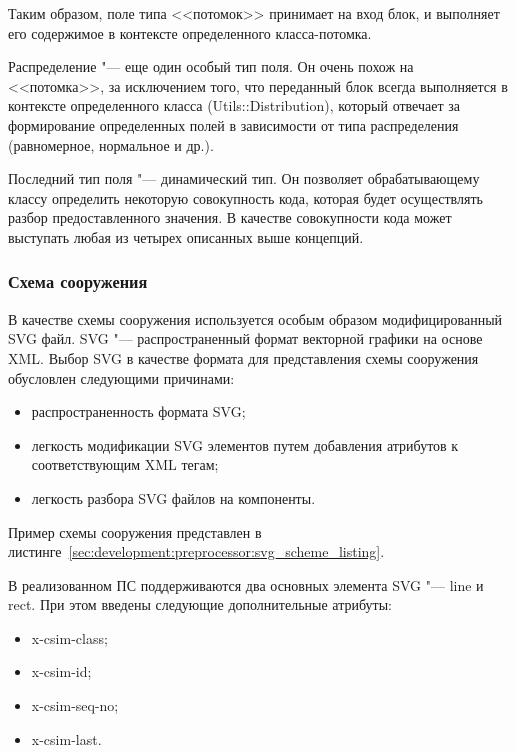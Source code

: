 Таким образом, поле типа <<потомок>> принимает на вход блок, и выполняет его содержимое в контексте определенного класса-потомка.

Распределение "--- еще один особый тип поля. Он очень похож на <<потомка>>, за исключением того, что переданный блок всегда выполняется в контексте определенного класса (Utils::Distribution),
который отвечает за формирование определенных полей в зависимости от типа распределения (равномерное, нормальное и др.).

Последний тип поля "--- динамический тип. Он позволяет обрабатывающему классу определить некоторую совокупность кода, которая будет осуществлять разбор предоставленного значения.
В качестве совокупности кода может выступать любая из четырех описанных выше концепций.

\subsubsection{Схема сооружения}
\label{sec:development:preprocessor:svg_scheme}

В качестве схемы сооружения используется особым образом модифицированный SVG файл.
SVG "--- распространенный формат векторной графики на основе XML.
Выбор SVG в качестве формата для представления схемы сооружения обусловлен следующими причинами:
\begin{itemize}
  \item распространенность формата SVG;
  \item легкость модификации SVG элементов путем добавления атрибутов к соответствующим XML тегам;
  \item легкость разбора SVG файлов на компоненты.
\end{itemize}

Пример схемы сооружения представлен в листинге~\ref{sec:development:preprocessor:svg_scheme_listing}.



В реализованном ПС поддерживаются два основных элемента SVG "--- line и rect.
При этом введены следующие дополнительные атрибуты:
\begin{itemize}
  \item x-csim-class;
  \item x-csim-id;
  \item x-csim-seq-no;
  \item x-csim-last.
\end{itemize}

